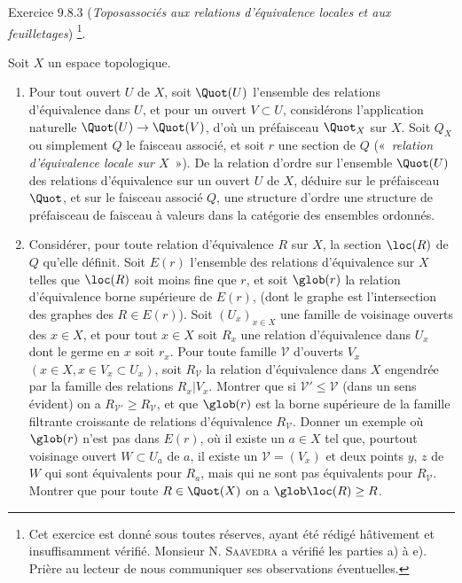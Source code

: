 \begin{enonce*}[remark]{Exercice 9.8.3}
(\emph{Topos\pageoriginale associés aux relations d'équivalence
locales et aux feuilletages}) \footnote[1]{Cet exercice est donné
sous toutes réserves, ayant été rédigé hâtivement et insuffisamment
vérifié. Monsieur N. \textsc{Saavedra} a vérifié les parties a) à
e). Prière au lecteur de nous communiquer ses observations
éventuelles.}.

Soit $X$ un espace topologique.
\begin{enumerate}
\renewcommand{\theenumi}{\alph{enumi}}
\renewcommand{\labelenumi}{\theenumi)}
\item Pour tout ouvert $U$ de $X$, soit $\Quot(U)$ l'ensemble des
relations d'équivalence dans $U$, et pour un ouvert $V\subset U$,
considérons l'application naturelle $\Quot(U)\rightarrow \Quot(V)$,
d'où un préfaisceau $\Quot_X$ sur $X$. Soit $Q_X$ ou simplement $Q$
le faisceau associé, et soit $r$ une section de $Q$ (« \emph{relation d'équivalence locale sur $X$} »). De la relation
d'ordre sur l'ensemble $\Quot(U)$ des relations d'équivalence sur un
ouvert $U$ de $X$, déduire sur le préfaisceau $\Quot$, et sur le
faisceau associé $Q$, une structure d'ordre \ie une structure de
préfaisceau \resp de faisceau à valeurs dans la catégorie des
ensembles ordonnés.

\item Considérer, pour toute relation d'équivalence $R$ sur $X$, la
section $\loc(R)$ de $Q$ qu'elle définit. Soit $E(r)$ l'ensemble des
relations d'équivalence sur $X$ telles que $\loc(R)$ soit moins fine
que $r$, et soit $\glob(r)$ la relation d'équivalence borne
supérieure de $E(r)$, (dont le graphe est l'intersection des graphes
des $R\in E(r)$). Soit $(U_x)_{x\in X}$ une famille de voisinage
ouverts des $x\in X$, et pour tout $x\in X$ soit $R_x$ une relation
d'équivalence dans $U_x$ dont le germe en $x$ soit $r_x$. Pour toute
famille $𝒱$ d'ouverts $V_x$ $(x\in X, x\in V_x\subset U_x)$,
soit $R_{𝒱}$ la relation d'équivalence dans $X$ engendrée
par la famille des relations $R_x| V_x$. Montrer que si
$𝒱'\leq 𝒱$ (dans un sens évident) on a
$R_{𝒱'}\geq R_{𝒱}$, et que $\glob(r)$ est la borne
supérieure de la famille filtrante croissante de relations
d'équivalence $R_{𝒱}$. Donner un exemple où $\glob(r)$ n'est
pas dans $E(r)$, \ie où il existe un $a\in X$ tel que,
pour\pageoriginale tout voisinage ouvert $W\subset U_a$ de $a$, il
existe un $𝒱=(V_x)$ et deux points $y$, $z$ de $W$ qui sont
équivalents pour $R_a$, mais qui ne sont pas équivalents pour
$R_{𝒱}$. Montrer que pour toute $R\in \Quot(X)$ on a
$\glob\loc(R)\geq R$.


\end{enumerate}
\end{enonce*}
